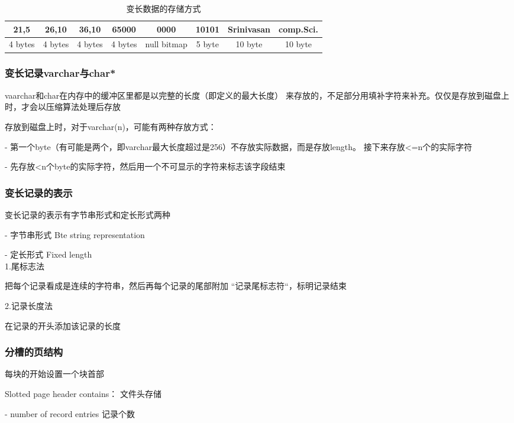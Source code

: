\documentclass{article}        %
\begin{document}
\begin{table}[htbp]
  \centering
  \caption{变长数据的存储方式}
  \begin{tabular}{|c|c|c|c|c|c|c|c|}
    \hline 
    21,5&26,10&36,10&65000&0000&10101&Srinivasan&comp.Sci. \\
    \hline
    4 bytes&4 bytes&4 bytes& 4 bytes&null bitmap&5 byte& 10 byte& 10 byte \\
  \end{tabular}
\end{table}

\subsubsection{变长记录varchar与char*}

vaarchar和char在内存中的缓冲区里都是以完整的长度（即定义的最大长度）
来存放的，不足部分用填补字符来补充。仅仅是存放到磁盘上时，才会以压缩算法处理后存放 

存放到磁盘上时，对于varchar(n)，可能有两种存放方式：

- 第一个byte（有可能是两个，即varchar最大长度超过是256）不存放实际数据，而是存放length。
接下来存放<=n个的实际字符

- 先存放<n个byte的实际字符，然后用一个不可显示的字符来标志该字段结束 

\subsubsection{变长记录的表示}

变长记录的表示有字节串形式和定长形式两种 

- 字节串形式 Bte string representation 

- 定长形式 Fixed length\\ 

1.尾标志法 

把每个记录看成是连续的字符串，然后再每个记录的尾部附加
“记录尾标志符“，标明记录结束 

2.记录长度法

在记录的开头添加该记录的长度 

\subsubsection{分槽的页结构}

每块的开始设置一个块首部 

Slotted page header contains： 文件头存储 

- number of record entries 记录个数 
\end{document}
